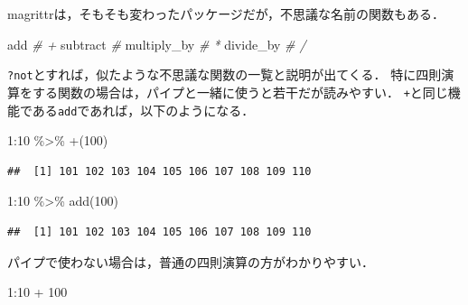 \documentclass[
]{article}
\newenvironment{Shaded}{\begin{snugshade}}{\end{snugshade}}
\newcommand{\AttributeTok}[1]{\textcolor[rgb]{0.77,0.63,0.00}{#1}}
\newcommand{\CommentTok}[1]{\textcolor[rgb]{0.56,0.35,0.01}{\textit{#1}}}
\newcommand{\DecValTok}[1]{\textcolor[rgb]{0.00,0.00,0.81}{#1}}
\newcommand{\FunctionTok}[1]{\textcolor[rgb]{0.00,0.00,0.00}{#1}}
\newcommand{\NormalTok}[1]{#1}
\newcommand{\SpecialCharTok}[1]{\textcolor[rgb]{0.00,0.00,0.00}{#1}}
\newcommand{\StringTok}[1]{\textcolor[rgb]{0.31,0.60,0.02}{#1}}
\begin{document}
magrittrは，そもそも変わったパッケージだが，不思議な名前の関数もある．

\begin{Shaded}
\begin{Highlighting}[]
\NormalTok{add          }\CommentTok{\# \textasciigrave{}+\textasciigrave{}}
\NormalTok{subtract     }\CommentTok{\# \textasciigrave{}{-}\textasciigrave{}}
\NormalTok{multiply\_by  }\CommentTok{\# \textasciigrave{}*\textasciigrave{}}
\NormalTok{divide\_by    }\CommentTok{\# \textasciigrave{}/\textasciigrave{}}
\end{Highlighting}
\end{Shaded}

\texttt{?not}とすれば，似たような不思議な関数の一覧と説明が出てくる．
特に四則演算をする関数の場合は，パイプと一緒に使うと若干だが読みやすい．
\texttt{+}と同じ機能である\texttt{add}であれば，以下のようになる．

\begin{Shaded}
\begin{Highlighting}[]
\DecValTok{1}\SpecialCharTok{:}\DecValTok{10} \SpecialCharTok{\%\textgreater{}\%} 
  \StringTok{\textasciigrave{}}\AttributeTok{+}\StringTok{\textasciigrave{}}\NormalTok{(}\DecValTok{100}\NormalTok{)}
\end{Highlighting}
\end{Shaded}

\begin{verbatim}
##  [1] 101 102 103 104 105 106 107 108 109 110
\end{verbatim}

\begin{Shaded}
\begin{Highlighting}[]
\DecValTok{1}\SpecialCharTok{:}\DecValTok{10} \SpecialCharTok{\%\textgreater{}\%} 
  \FunctionTok{add}\NormalTok{(}\DecValTok{100}\NormalTok{)}
\end{Highlighting}
\end{Shaded}

\begin{verbatim}
##  [1] 101 102 103 104 105 106 107 108 109 110
\end{verbatim}

パイプで使わない場合は，普通の四則演算の方がわかりやすい．

\begin{Shaded}
\begin{Highlighting}[]
\DecValTok{1}\SpecialCharTok{:}\DecValTok{10} \SpecialCharTok{+} \DecValTok{100}
\end{Highlighting}
\end{Shaded}
\end{document}
